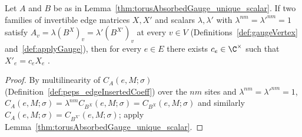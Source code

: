 \begin{lemma}%
    \label{thm:torusGauge_unique_scalar_of_perVertex}
    \leanok
    Let $A$ and $B$ be as in
    Lemma~\ref{thm:torusAbsorbedGauge_unique_scalar}. If two families of
    invertible edge matrices $X,X'$ and scalars $\lambda,\lambda'$ with
    $\lambda^{nm}={\lambda'}^{nm}=1$ satisfy
    $A_v=\lambda(B^X)_v=\lambda'(B^{X'})_v$ at every $v\in V$
    (Definitions~\ref{def:gaugeVertex} and~\ref{def:applyGauge}), then for
    every $e\in E$ there exists $c_e\in\C^\times$ such that $X'_e=c_e X_e$
    \cite[Theorem~3]{Molnar2018NormalPEPS}.
    \begin{proof}
        \leanok
        By multilinearity of $C_A(e,M;\sigma)$
        (Definition~\ref{def:peps_edgeInsertedCoeff}) over the $nm$ sites and
        $\lambda^{nm}={\lambda'}^{nm}=1$,
        $C_A(e,M;\sigma)=\lambda^{nm}C_{B^X}(e,M;\sigma)=C_{B^X}(e,M;\sigma)$
        and similarly $C_A(e,M;\sigma)=C_{B^{X'}}(e,M;\sigma)$; apply
        Lemma~\ref{thm:torusAbsorbedGauge_unique_scalar}.
    \end{proof}
\end{lemma}
